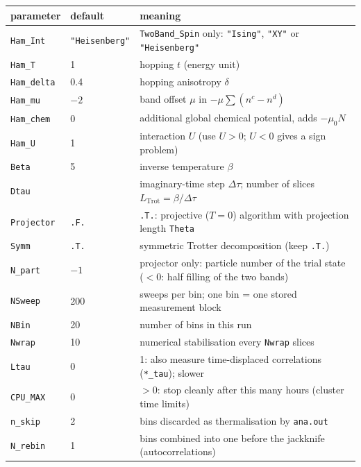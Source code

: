 \documentclass[11pt,a4paper]{article}
\newcommand{\f}[1]{\texttt{#1}}          %
\begin{document}
\begin{center}
\small
\begin{tabularx}{\textwidth}{llX}
\toprule
parameter & default & meaning \\
\midrule
\f{Ham\_Int}   & \f{"Heisenberg"} & \f{TwoBand\_Spin} only: \f{"Ising"}, \f{"XY"} or \f{"Heisenberg"} \\
\f{Ham\_T}     & 1     & hopping $t$ (energy unit) \\
\f{Ham\_delta} & 0.4   & hopping anisotropy $\delta$ \\
\f{Ham\_mu}    & $-2$  & band offset $\mu$ in $-\mu\sum(n^c-n^d)$ \\
\f{Ham\_chem}  & 0     & additional global chemical potential, adds $-\mu_0 N$ \\
\f{Ham\_U}     & 1     & interaction $U$ (use $U>0$; $U<0$ gives a sign problem) \\
\f{Beta}       & 5     & inverse temperature $\beta$ \\
\f{Dtau}       &       & imaginary-time step $\Delta\tau$; number of slices $L_\text{Trot}=\beta/\Delta\tau$ \\
\f{Projector}  & \f{.F.} & \f{.T.}: projective ($T=0$) algorithm with projection length \f{Theta} \\
\f{Symm}       & \f{.T.} & symmetric Trotter decomposition (keep \f{.T.}) \\
\f{N\_part}    & $-1$  & projector only: particle number of the trial state ($<0$: half filling of the two bands) \\
\midrule
\f{NSweep}     & 200   & sweeps per bin; one bin = one stored measurement block \\
\f{NBin}       & 20    & number of bins in this run \\
\f{Nwrap}      & 10    & numerical stabilisation every \f{Nwrap} slices \\
\f{Ltau}       & 0     & 1: also measure time-displaced correlations (\f{*\_tau}); slower \\
\f{CPU\_MAX}   & 0     & $>0$: stop cleanly after this many hours (cluster time limits) \\
\midrule
\f{n\_skip}    & 2     & bins discarded as thermalisation by \f{ana.out} \\
\f{N\_rebin}   & 1     & bins combined into one before the jackknife (autocorrelations) \\
\bottomrule
\end{tabularx}
\end{center}
\end{document}
